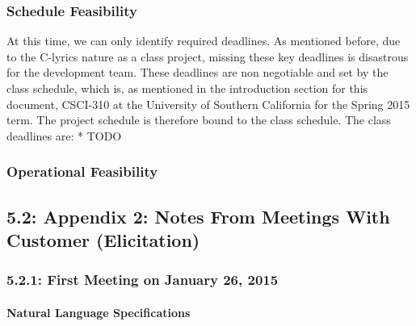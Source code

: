 \documentclass[]{article}
\begin{document}
\subsubsection{Schedule Feasibility}\label{schedule-feasibility}

At this time, we can only identify required deadlines. As mentioned
before, due to the C-lyrics nature as a class project, missing these key
deadlines is disastrous for the development team. These deadlines are
non negotiable and set by the class schedule, which is, as mentioned in
the introduction section for this document, CSCI-310 at the University
of Southern California for the Spring 2015 term. The project schedule is
therefore bound to the class schedule. The class deadlines are: * TODO

\subsubsection{Operational Feasibility}\label{operational-feasibility}

\subsection{5.2: Appendix 2: Notes From Meetings With Customer
(Elicitation)}\label{appendix-2-notes-from-meetings-with-customer-elicitation}

\subsubsection{5.2.1: First Meeting on January 26,
2015}\label{first-meeting-on-january-26-2015}

\paragraph{Natural Language
Specifications}\label{natural-language-specifications}
\end{document}
